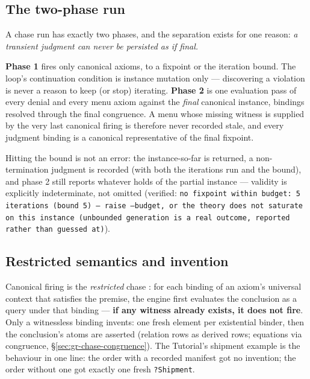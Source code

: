 \subsection{The two-phase run}
\label{sec:gr-chase-run}

A chase run has exactly two phases, and the separation exists for
one reason: \emph{a transient judgment can never be persisted as
if final.}

\textbf{Phase 1} fires only canonical axioms, to a fixpoint or the
iteration bound. The loop's continuation condition is instance
mutation only — discovering a violation is never a reason to keep (or
stop) iterating. \textbf{Phase 2} is one evaluation pass of every
denial and every menu axiom against the \emph{final} canonical
instance, bindings resolved through the final congruence. A menu
whose missing witness is supplied by the very last canonical firing
is therefore never recorded stale, and every judgment binding is a
canonical representative of the final fixpoint.

Hitting the bound is not an error: the instance-so-far is returned, a
non-termination judgment is recorded (with both the iterations run
and the bound), and phase 2 still reports whatever holds of the
partial instance — validity is explicitly indeterminate, not omitted
(verified: \texttt{no fixpoint within budget: 5 iterations (bound 5)
— raise --budget, or the theory does not saturate on this instance
(unbounded generation is a real outcome, reported rather than guessed
at)}).

\subsection{Restricted semantics and invention}
\label{sec:gr-chase-restricted}

Canonical firing is the \emph{restricted} chase
\cite{deutschnashremmel2008}: for each binding of
an axiom's universal context that satisfies the premise, the engine
first evaluates the conclusion as a query under that binding —
\textbf{if any witness already exists, it does not fire}. Only a
witnessless binding invents: one fresh element per existential
binder, then the conclusion's atoms are asserted (relation rows as
derived rows; equations via congruence,
\S\ref{sec:gr-chase-congruence}). The Tutorial's shipment example is
the behaviour in one line: the order with a recorded manifest got no
invention; the order without one got exactly one fresh
\texttt{?Shipment}.

